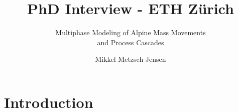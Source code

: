 \documentclass[
	10pt, %
]{beamer}
\title[PhD Interview - ETH Zürich]{PhD Interview - ETH Zürich} %
\subtitle{Multiphase Modeling of Alpine Mass Movements \\ and Process Cascades}
\author[Mikkel Metzsch Jensen]{Mikkel Metzsch Jensen} %
\institute[UiO]{University of Oslo} %
\date[February 13, 2023]
{February 13, 2023 \\
\vspace*{20px}
\begin{enumerate}
	\item Introduction 
	\item Master's thesis
	\item PhD project interpretation
\end{enumerate}}
\begin{document}

\begin{frame}
	\titlepage %
\end{frame}



	



\section{Introduction}
\end{document}
